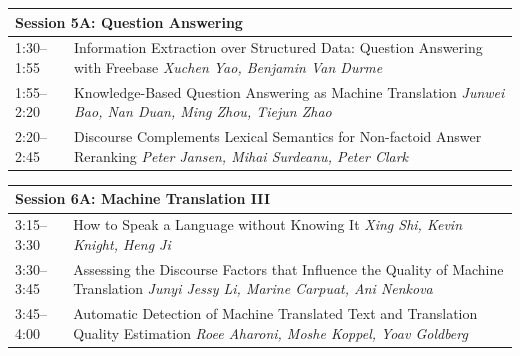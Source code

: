 \documentclass{book}
\renewcommand{\large}{\fontsize{36}{40}\selectfont}
\begin{document}
\begin{tabular}{p{3in}p{16in}}
  \multicolumn{2}{l}{\bfseries\large Session 5A: Question Answering} \\\hline

    
    1:30--1:55
    &	Information Extraction over Structured Data: Question Answering with Freebase \newline 
    {\itshape Xuchen Yao, Benjamin Van Durme} \\
    
    1:55--2:20
    &	Knowledge-Based Question Answering as Machine Translation \newline 
    {\itshape Junwei Bao, Nan Duan, Ming Zhou, Tiejun Zhao} \\
    
    2:20--2:45
    &	Discourse Complements Lexical Semantics for Non-factoid Answer Reranking \newline 
    {\itshape Peter Jansen, Mihai Surdeanu, Peter Clark} \\
    
\end{tabular}

\begin{tabular}{p{3in}p{16in}}
  \multicolumn{2}{l}{\bfseries\large Session 6A: Machine Translation III} \\\hline

    
    3:15--3:30
    &	How to Speak a Language without Knowing It \newline 
    {\itshape Xing Shi, Kevin Knight, Heng Ji} \\
    
    3:30--3:45
    &	Assessing the Discourse Factors that Influence the Quality of Machine Translation \newline 
    {\itshape Junyi Jessy Li, Marine Carpuat, Ani Nenkova} \\
    
    3:45--4:00
    &	Automatic Detection of Machine Translated Text and Translation Quality Estimation \newline 
    {\itshape Roee Aharoni, Moshe Koppel, Yoav Goldberg} \\
    
\end{tabular}
\end{document}
